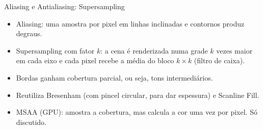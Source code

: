 \documentclass[aspectratio=169,11pt]{beamer}
\begin{document}
\begin{frame}{Aliasing e Antialiasing: Supersampling}
\begin{itemize}
  \item \alert{Aliasing}: uma amostra por pixel em linhas inclinadas e contornos produz degraus.
  \item \alert{Supersampling} com fator $k$: a cena é renderizada numa grade $k$ vezes maior em cada eixo e cada pixel recebe a \alert{média} do bloco $k\times k$ (filtro de caixa).
  \item Bordas ganham cobertura parcial, ou seja, tons intermediários.
  \item Reutiliza Bresenham (com pincel circular, para dar espessura) e Scanline Fill.
  \item MSAA (GPU): amostra a cobertura, mas calcula a cor uma vez por pixel. Só discutido.
\end{itemize}

\vspace{0.2cm}
\begin{center}
\end{center}
\end{frame}
\end{document}
